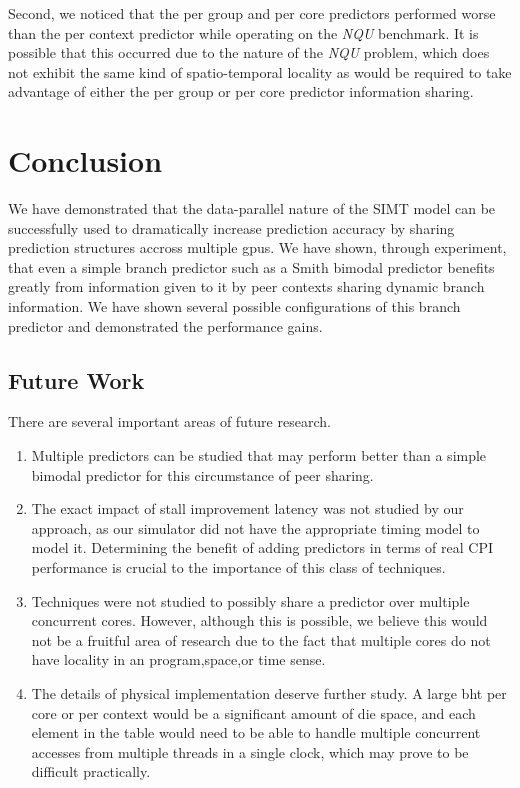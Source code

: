 \documentclass[conference]{IEEEtran}
\begin{document}
Second, we noticed that the per group and per core predictors performed worse than the per context predictor while operating on the \emph{NQU} benchmark.  It is possible that this occurred due to the nature of the \emph{NQU} problem, which does not exhibit the same kind of spatio-temporal locality as would be required to take advantage of either the per group or per core predictor information sharing.

\section{Conclusion}
We have demonstrated that the data-parallel nature of the SIMT model can be successfully used to dramatically increase prediction accuracy by sharing prediction structures accross multiple gpus.  We have shown, through experiment, that even
a simple branch predictor such as a Smith bimodal predictor benefits greatly from information given to it by peer contexts sharing dynamic branch information.  We have shown several possible configurations of this branch predictor and demonstrated the performance gains.

\subsection{Future Work}

There are several important areas of future research.

\begin{enumerate}
 \item Multiple predictors can be studied that may perform better than a simple bimodal predictor for this circumstance of peer sharing.
\item The exact impact of stall improvement latency was not studied by our approach, as our simulator did not have the appropriate timing model to model it.  Determining the 
benefit of adding predictors in terms of real CPI performance is crucial to the importance of this class of techniques.
\item Techniques were not studied to possibly share a predictor over multiple concurrent cores.  However, although this is possible, we believe this would not 
be a fruitful area of research due to the fact that multiple cores do not have locality in an program,space,or time sense.
\item The details of physical implementation deserve further study.  A large bht per core or per context would be a significant amount of die space, and each
element in the table would need to be able to handle multiple concurrent accesses from multiple threads in a single clock, which may prove to be difficult practically.
\end{enumerate}
\end{document}
